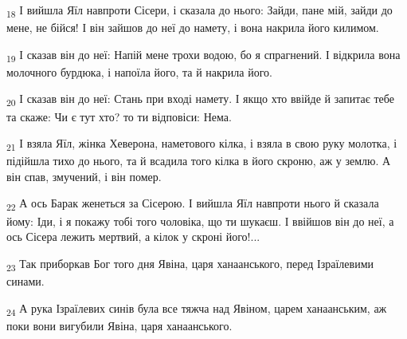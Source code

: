 \begin{tcolorbox}
\textsubscript{18} І вийшла Яїл навпроти Сісери, і сказала до нього: Зайди, пане мій, зайди до мене, не бійся! І він зайшов до неї до намету, і вона накрила його килимом.
\end{tcolorbox}
\begin{tcolorbox}
\textsubscript{19} І сказав він до неї: Напій мене трохи водою, бо я спрагнений. І відкрила вона молочного бурдюка, і напоїла його, та й накрила його.
\end{tcolorbox}
\begin{tcolorbox}
\textsubscript{20} І сказав він до неї: Стань при вході намету. І якщо хто ввійде й запитає тебе та скаже: Чи є тут хто? то ти відповіси: Нема.
\end{tcolorbox}
\begin{tcolorbox}
\textsubscript{21} І взяла Яїл, жінка Хеверона, наметового кілка, і взяла в свою руку молотка, і підійшла тихо до нього, та й всадила того кілка в його скроню, аж у землю. А він спав, змучений, і він помер.
\end{tcolorbox}
\begin{tcolorbox}
\textsubscript{22} А ось Барак женеться за Сісерою. І вийшла Яїл навпроти нього й сказала йому: Іди, і я покажу тобі того чоловіка, що ти шукаєш. І ввійшов він до неї, а ось Сісера лежить мертвий, а кілок у скроні його!...
\end{tcolorbox}
\begin{tcolorbox}
\textsubscript{23} Так приборкав Бог того дня Явіна, царя ханаанського, перед Ізраїлевими синами.
\end{tcolorbox}
\begin{tcolorbox}
\textsubscript{24} А рука Ізраїлевих синів була все тяжча над Явіном, царем ханаанським, аж поки вони вигубили Явіна, царя ханаанського.
\end{tcolorbox}
